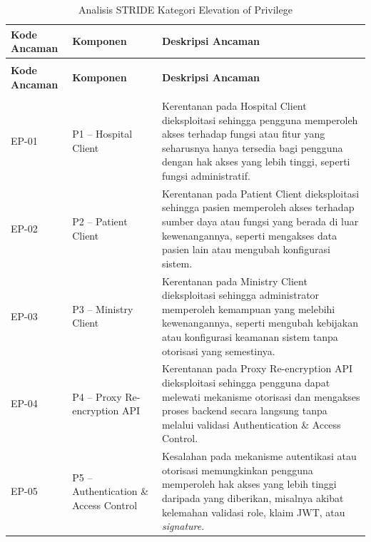 \begin{xltabular}{\textwidth}{|>{\centering\arraybackslash}p{1.8cm}|>{\raggedright\arraybackslash}p{3.2cm}|X|}
    \caption{Analisis STRIDE Kategori Elevation of Privilege}
    \label{tab:stride-elevation-of-privilege} \\
    \hline
    \textbf{Kode Ancaman} &
    \textbf{Komponen} &
    \textbf{Deskripsi Ancaman} \\
    \hline
    \endfirsthead

    {} \\
    \hline
    \textbf{Kode Ancaman} &
    \textbf{Komponen} &
    \textbf{Deskripsi Ancaman} \\
    \hline
    \endhead

    \hline
     \\
    \endfoot

    \hline
    \endlastfoot

    EP-01 &
    P1 -- Hospital Client &
    Kerentanan pada Hospital Client dieksploitasi sehingga pengguna memperoleh akses terhadap fungsi atau fitur yang seharusnya hanya tersedia bagi pengguna dengan hak akses yang lebih tinggi, seperti fungsi administratif. \\
    \hline

    EP-02 &
    P2 -- Patient Client &
    Kerentanan pada Patient Client dieksploitasi sehingga pasien memperoleh akses terhadap sumber daya atau fungsi yang berada di luar kewenangannya, seperti mengakses data pasien lain atau mengubah konfigurasi sistem. \\
    \hline

    EP-03 &
    P3 -- Ministry Client &
    Kerentanan pada Ministry Client dieksploitasi sehingga administrator memperoleh kemampuan yang melebihi kewenangannya, seperti mengubah kebijakan atau konfigurasi keamanan sistem tanpa otorisasi yang semestinya. \\
    \hline

    EP-04 &
    P4 -- Proxy Re-encryption API &
    Kerentanan pada Proxy Re-encryption API dieksploitasi sehingga pengguna dapat melewati mekanisme otorisasi dan mengakses proses backend secara langsung tanpa melalui validasi Authentication \& Access Control. \\
    \hline

    EP-05 &
    P5 -- Authentication \& Access Control &
    Kesalahan pada mekanisme autentikasi atau otorisasi memungkinkan pengguna memperoleh hak akses yang lebih tinggi daripada yang diberikan, misalnya akibat kelemahan validasi role, klaim JWT, atau \textit{signature}. \\
    \hline


\end{xltabular}

